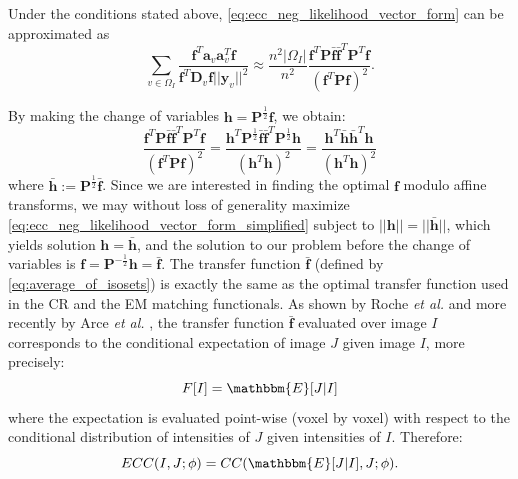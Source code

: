 Under the conditions stated above, \eqref{eq:ecc_neg_likelihood_vector_form} can be approximated as
\begin{equation}
    \sum_{v\in\Omega_{I}}\frac{\mathbf{f}^{T}\mathbf{a}_{v}\mathbf{a}_{v}^{T}\mathbf{f}}
    {\mathbf{f}^{T} \mathbf{D}_{v} \mathbf{f}||\mathbf{y}_{v}||^{2}} \approx
    \frac{n^{2}|\Omega_{I}|}{n^{2}}
    \frac{\mathbf{f}^{T}\mathbf{P}\mathbf{\bar{f}}\mathbf{\bar{f}}^{T}\mathbf{P}^{T}\mathbf{f}}{\left(\mathbf{f}^{T} \mathbf{P} \mathbf{f}\right)^{2}}.
\end{equation}

By making the change of variables $\mathbf{h} = \mathbf{P}^{\frac{1}{2}}\mathbf{f}$, we obtain:
\begin{equation}\label{eq:ecc_neg_likelihood_vector_form_simplified}
    \frac{\mathbf{f}^{T}\mathbf{P}\mathbf{\bar{f}}\mathbf{\bar{f}}^{T}\mathbf{P}^{T}\mathbf{f}}{\left(\mathbf{f}^{T} \mathbf{P} \mathbf{f}\right)^{2}} =
    \frac{\mathbf{h}^{T}\mathbf{P}^{\frac{1}{2}}\mathbf{\bar{f}}\mathbf{\bar{f}}^{T}\mathbf{P}^{\frac{1}{2}}\mathbf{h}} {\left(\mathbf{h}^{T}\mathbf{h}\right)^{2}} =
    \frac{\mathbf{h}^{T}\mathbf{\bar{h}}\mathbf{\bar{h}}^{T}\mathbf{h}} {\left(\mathbf{h}^{T}\mathbf{h}\right)^{2}}
\end{equation}
where $\mathbf{\bar{h}} := \mathbf{P}^{\frac{1}{2}}\mathbf{\bar{f}}$. Since we are interested in finding the optimal $\mathbf{f}$ modulo affine transforms, we may without loss of generality maximize \eqref{eq:ecc_neg_likelihood_vector_form_simplified} subject to $||\mathbf{h}|| = ||\mathbf{\bar{h}}||$, which yields solution $\mathbf{h} = \mathbf{\bar{h}}$, and the solution to our problem before the change of variables is $\mathbf{f} = \mathbf{P}^{-\frac{1}{2}}\mathbf{h} = \mathbf{\bar{f}}$. The transfer function $\mathbf{\bar{f}}$ (defined by \eqref{eq:average_of_isosets}) is exactly the same as the optimal transfer function used in the CR and the EM matching functionals. As shown by Roche {\it et al.} \cite{Roche1998, Roche2000} and more recently by Arce {\it et al.} \cite{Arce-santana2014}, the transfer function $\mathbf{\bar{f}}$ evaluated over image $I$ corresponds to the conditional expectation of image $J$ given image $I$, more precisely:
\begin{equation*}
    F[I] = \mathbbm{E}[J | I]
\end{equation*}
where the expectation is evaluated point-wise (voxel by voxel) with respect to the conditional distribution of intensities of $J$ given intensities of $I$. Therefore:
\begin{equation}\label{eq:ecc_meaning}
    ECC(I, J; \phi) = CC(\mathbbm{E}[J|I], J ; \phi).
\end{equation}
